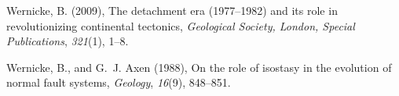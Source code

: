 \documentclass[twocolumn,grl]{AGUTeX}
\begin{document}
\begin{article}
\begin{thebibliography}{23}
Wernicke, B. (2009), The detachment era (1977--1982) and its role in
  revolutionizing continental tectonics, \textit{Geological Society, London,
  Special Publications}, \textit{321}(1), 1--8.

Wernicke, B., and G.~J. Axen (1988), On the role of isostasy in the evolution
  of normal fault systems, \textit{Geology}, \textit{16}(9), 848--851.

\end{thebibliography}



\end{article}


%
%
\end{document}
